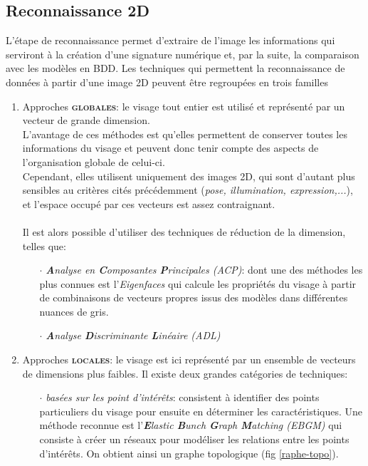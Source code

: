 \subsection{Reconnaissance 2D}
L'étape de reconnaissance permet d'extraire de l'image les informations qui serviront à la création d'une signature numérique et, par la suite, la comparaison avec les modèles en BDD.
Les techniques qui permettent la reconnaissance de données à partir d'une image 2D peuvent être regroupées en trois familles \cite{Xphdthesis_1}
\begin{enumerate}\setlength{\itemsep}{.3em}
\item Approches \textsc{\textbf{globales}}: le visage tout entier est utilisé et représenté par un vecteur de grande dimension.
\\L'avantage de ces méthodes est qu'elles permettent de conserver toutes les informations du visage et peuvent donc tenir compte des aspects de l'organisation globale de celui-ci. 
\\Cependant, elles utilisent uniquement des images 2D, qui sont d'autant plus sensibles au critères cités précédemment (\textit{pose, illumination, expression,...}), et l'espace occupé par ces vecteurs est assez contraignant. \paragraph{}Il est alors possible d'utiliser des techniques de réduction de la dimension, telles que:
	\begin{itemize}\setlength{\itemsep}{.2em}
	\item[$\cdot$]\textit{\textbf{A}nalyse en \textbf{C}omposantes \textbf{P}rincipales (ACP)}: dont une des méthodes les plus connues est l'\textit{Eigenfaces} qui calcule les propriétés du visage à partir de combinaisons de vecteurs propres issus des modèles dans différentes nuances de gris.
	\item[$\cdot$]\textit{\textbf{A}nalyse \textbf{D}iscriminante \textbf{L}inéaire (ADL)}
	\end{itemize}
\item Approches \textsc{\textbf{locales}}: le visage est ici représenté par un ensemble de vecteurs de dimensions plus faibles. Il existe deux grandes catégories de techniques:
	\begin{itemize}
	\item[$\cdot$] \textit{basées sur les point d'intérêts}: consistent à identifier des points particuliers du visage pour ensuite en déterminer les caractéristiques. Une méthode reconnue est l'\textit{\textbf{E}lastic \textbf{B}unch \textbf{G}raph \textbf{M}atching (EBGM)} qui consiste à créer un réseaux pour modéliser les relations entre les points d'intérêts. On obtient ainsi un graphe topologique (fig \ref{raphe-topo}).


\end{itemize}
\end{enumerate}

